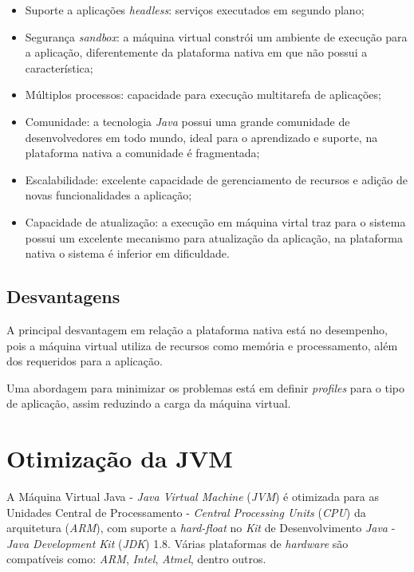 \begin{itemize}

	\item Suporte a aplicações \textit{headless}: serviços executados em
	segundo plano;

	\item Segurança \textit{sandbox}: a máquina virtual constrói um ambiente de
	execução para a aplicação, diferentemente da plataforma nativa em que não
	possui a característica;

	\item Múltiplos processos: capacidade para execução multitarefa de
	aplicações;

	\item Comunidade: a tecnologia \textit{Java} possui uma grande comunidade
	de desenvolvedores em todo mundo, ideal para o aprendizado e suporte, na
	plataforma nativa a comunidade é fragmentada;

	\item Escalabilidade: excelente capacidade de gerenciamento de recursos e
	adição de novas funcionalidades a aplicação;

	\item Capacidade de atualização: a execução em máquina virtal traz para o
	sistema possui um excelente mecanismo para atualização da aplicação, na
	plataforma nativa o sistema é inferior em dificuldade.

\end{itemize}

\subsection{Desvantagens}

A principal desvantagem em relação a plataforma nativa está no desempenho, pois
a máquina virtual utiliza de recursos como memória e processamento, além dos
requeridos para a aplicação.

Uma abordagem para minimizar os problemas está em definir \textit{profiles}
para o tipo de aplicação, assim reduzindo a carga da máquina virtual.

\section{Otimização da JVM}

A Máquina Virtual Java - \textit{Java Virtual Machine} (\textit{JVM}) é
otimizada para as Unidades Central de Processamento - \textit{Central
  Processing Units} (\textit{CPU}) da arquitetura (\textit{ARM}), com suporte a
\textit{hard-float} no \textit{Kit} de Desenvolvimento \textit{Java} -
\textit{Java Development Kit} (\textit{JDK}) 1.8. Várias plataformas de
\textit{hardware} são compatíveis como: \textit{ARM}, \textit{Intel},
\textit{Atmel}, dentro outros.
